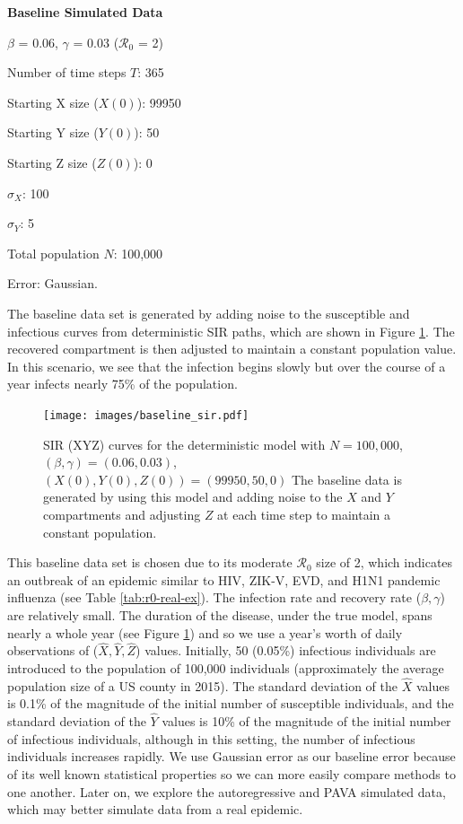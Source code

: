 \documentclass[12pt]{article}
\newcommand{\rr}{\ensuremath{\mathcal{R}_0}}
\begin{document}
\noindent \textbf{Baseline Simulated Data}
\begin{center}
	
	$\beta$ = 0.06, $\gamma$ = 0.03 ($\rr$ = 2)
	
	Number of time steps $T$: 365
	
	Starting X size ($X(0)$): 99950
	
	Starting Y size ($Y(0)$): 50
	
	Starting Z size ($Z(0)$): 0 
	
	$\sigma_X$: 100
	
	$\sigma_Y$: 5
	
	Total population $N$: 100,000

        Error: Gaussian.
	
      \end{center}
      The baseline data set is generated by adding noise to the susceptible and infectious curves from deterministic SIR paths, which are shown in Figure \ref{fig:baseline-data}.  The recovered compartment is then adjusted to maintain a constant population value.  In this scenario, we see that the infection begins slowly but over the course of a year infects nearly 75\% of the population.
      \begin{figure}
        \centering
        \texttt{[image: images/baseline\_sir.pdf]}
        \caption{SIR (XYZ) curves for the deterministic model with $N=100,000$, $(\beta, \gamma) = (0.06, 0.03)$, $(X(0), Y(0), Z(0))= (99950, 50,0)$  The baseline data is generated by using this model and adding noise to the $X$ and $Y$ compartments and adjusting $Z$ at each time step to maintain a constant population.}\label{fig:baseline-data}
        \end{figure}
      This baseline data set is chosen due to its moderate $\rr$ size of 2, which indicates an outbreak of an epidemic similar to HIV, ZIK-V, EVD, and H1N1 pandemic influenza (see Table \ref{tab:r0-real-ex}).  The infection rate and recovery rate ($\beta, \gamma$) are relatively small.  The duration of the disease, under the true model, spans nearly a whole year (see Figure \ref{fig:baseline-data}) and so we use a year's worth of daily observations of ($\hat{X},\hat{Y}, \hat{Z}$) values.  Initially, 50 (0.05\%) infectious individuals are introduced to the population of 100,000 individuals (approximately the average population size of a US county in 2015).  The standard deviation of the $\hat{X}$ values is 0.1\% of the magnitude of the initial number of susceptible individuals, and the standard deviation of the $\hat{Y}$ values is 10\% of the magnitude of the initial number of infectious individuals, although in this setting, the number of infectious individuals increases rapidly.  We use Gaussian error as our baseline error because of its well known statistical properties so we can more easily compare methods to one another.  Later on, we explore the autoregressive and PAVA simulated data, which may better simulate data from  a real epidemic.
\end{document}
